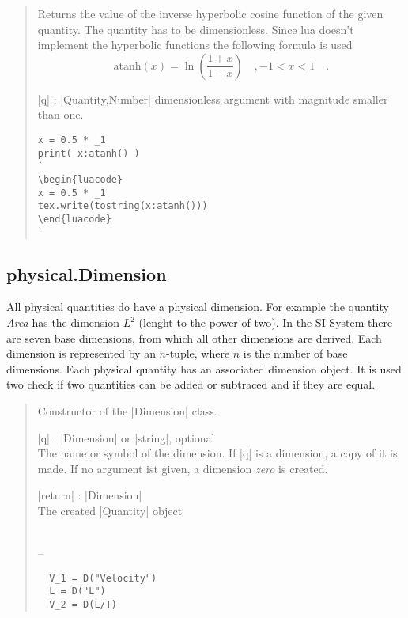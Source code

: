\documentclass{ltxdoc}
\renewcommand{\emph}[1]{\textit{#1}}
\begin{document}
\begin{quote}
  Returns the value of the inverse hyperbolic cosine function of the given quantity. The quantity has to be dimensionless. Since lua doesn't implement the hyperbolic functions the following formula is used 
  $$
    \text{atanh}(x) = \ln\left( \frac{1 + x}{1 - x} \right)  \quad, -1 < x < 1 \quad.
  $$

  \begin{description}
  \item |q| : |Quantity,Number| dimensionless argument with magnitude smaller than one.
  \end{description}

\begin{lstlisting}
x = 0.5 * _1
print( x:atanh() )
`
\begin{luacode}
x = 0.5 * _1
tex.write(tostring(x:atanh()))
\end{luacode}
`
\end{lstlisting}

\end{quote}



%
%
%
%
\subsection{physical.Dimension}

 All physical quantities do have a physical dimension. For example the quantity \emph{Area} has the dimension $L^2$ (lenght to the power of two). In the SI-System there are seven base dimensions, from which all other dimensions are derived. Each dimension is represented by an $n$-tuple, where $n$ is the number of base dimensions. Each physical quantity has an associated dimension object. It is used two check if two quantities can be added or subtraced and if they are equal. 


\begin{quote}
  Constructor of the |Dimension| class.

  \subtitle{Parameters}
  \begin{description}
  \item |q| : |Dimension| or |string|, optional\\
    The name or symbol of the dimension. If |q| is a dimension, a copy of it is made. If no argument ist given, a dimension \emph{zero} is created.

  \item |return| : |Dimension|\\
    The created |Quantity| object
  \end{description}

  \subtitle{Notes}\\
  --

  \subtitle{Examples}
  \begin{lstlisting}
  V_1 = D("Velocity")
  L = D("L")
  V_2 = D(L/T)
  \end{lstlisting}
\end{quote}
\end{document}
